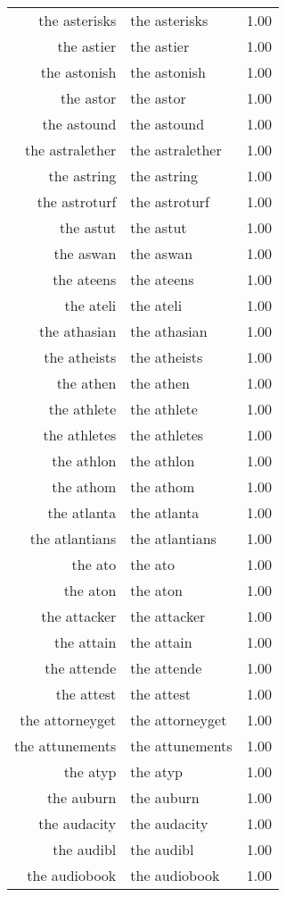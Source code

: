 \begin{table}[ht]
\begin{tabular}{rlr}
  the asterisks & the asterisks & 1.00 \\ 
  the astier & the astier & 1.00 \\ 
  the astonish & the astonish & 1.00 \\ 
  the astor & the astor & 1.00 \\ 
  the astound & the astound & 1.00 \\ 
  the astralether & the astralether & 1.00 \\ 
  the astring & the astring & 1.00 \\ 
  the astroturf & the astroturf & 1.00 \\ 
  the astut & the astut & 1.00 \\ 
  the aswan & the aswan & 1.00 \\ 
  the ateens & the ateens & 1.00 \\ 
  the ateli & the ateli & 1.00 \\ 
  the athasian & the athasian & 1.00 \\ 
  the atheists & the atheists & 1.00 \\ 
  the athen & the athen & 1.00 \\ 
  the athlete & the athlete & 1.00 \\ 
  the athletes & the athletes & 1.00 \\ 
  the athlon & the athlon & 1.00 \\ 
  the athom & the athom & 1.00 \\ 
  the atlanta & the atlanta & 1.00 \\ 
  the atlantians & the atlantians & 1.00 \\ 
  the ato & the ato & 1.00 \\ 
  the aton & the aton & 1.00 \\ 
  the attacker & the attacker & 1.00 \\ 
  the attain & the attain & 1.00 \\ 
  the attende & the attende & 1.00 \\ 
  the attest & the attest & 1.00 \\ 
  the attorneyget & the attorneyget & 1.00 \\ 
  the attunements & the attunements & 1.00 \\ 
  the atyp & the atyp & 1.00 \\ 
  the auburn & the auburn & 1.00 \\ 
  the audacity & the audacity & 1.00 \\ 
  the audibl & the audibl & 1.00 \\ 
  the audiobook & the audiobook & 1.00 \\ 

\end{tabular}
\end{table}
